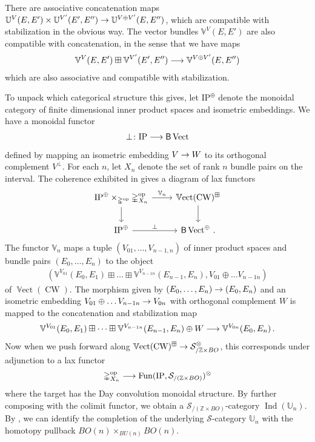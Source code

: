 \documentclass[10pt]{amsart}
\numberwithin{equation}{section}
\theoremstyle{definition}
\DeclareMathOperator{\Fun}{Fun}
\DeclareMathOperator{\op}{op}
\DeclareMathOperator{\Ind}{Ind}
\DeclareMathOperator{\Vect}{Vect}
\DeclareMathOperator{\bVect}{\mathbb{V}ect}
\DeclareMathOperator{\CW}{CW}
\newcommand{\bZ}{\mathbb{Z}}
\newcommand{\bU}{\mathbb{U}}
\newcommand{\bV}{\mathbb{V}}
\newcommand{\Simp}{\mathbb{\Delta}}
\newcommand{\cS}{\mathcal{S}}
\newcommand{\IP}{\mathrm{IP}}
\newcommand{\sfB}{\mathsf{B}}
\renewcommand{\to}{\mathchoice{\longrightarrow}{\rightarrow}{}{}}
\begin{document}
	There are associative concatenation maps $\bU^{V}(E,E')\times \bU^{V'}(E',E'') \to \bU^{V\oplus V'}(E,E'')$, which are compatible with stabilization in the obvious way.
  The vector bundles $\bV^{V}(E,E')$ are also compatible with concatenation, in the sense that we have maps
	\begin{align*}
		\bV^{V}(E,E')\boxplus \bV^{V'}(E',E'') \to \bV^{V\oplus V'}(E,E'')
	\end{align*}
	which are also associative and compatible with stabilization.

	To unpack which categorical structure this gives, let $\IP^{\oplus}$ denote the monoidal category of finite dimensional inner product spaces and isometric embeddings.
  We have a monoidal functor
	\begin{align*}
		\perp \colon \IP \to \sfB \Vect
	\end{align*}
	defined by mapping an isometric embedding $V\to W$ to its orthogonal complement $V^{\perp}$.
  For each $n$, let $X_{n}$ denote the set of rank $n$ bundle pairs on the interval.
  The coherence exhibited in  \cite[Lemma 3.18]{porcelli2024spectral} gives a diagram of lax functors
	\begin{equation*}
		\begin{tikzcd}
			\IP^{\oplus}\times_{\Simp^{\op}} \Simp^{\op}_{X_{n}} \arrow[r, "\bV_{n}"] \arrow[d]      &   \bVect(\CW)^{\boxplus}  \arrow[d] \\
			\IP^{\oplus}  \arrow[r,"\perp"]               &  \sfB \Vect^{\oplus} \,.
		\end{tikzcd}
	\end{equation*}
	The functor $\bV_{n}$ maps a tuple $(V_{01},\dots ,V_{n-1, n})$ of inner product spaces and bundle pairs $(E_{0},\dots, E_{n})$ to the object
	\begin{align*}
		(\bV^{V_{01}}(E_{0},E_{1})\boxplus \dots \boxplus \bV^{V_{n-1n}}(E_{n-1},E_{n}), V_{01}\oplus \dots V_{n-1n})
	\end{align*}
	of $\bVect(\CW)$.
  The morphism given by $(E_{0},\dots ,E_{n}) \to (E_{0},E_{n})$ and an isometric embedding $V_{01}\oplus \dots V_{n-1n} \to V_{0n}$ with orthogonal complement $W$ is mapped to the concatenation and stabilization map
	\begin{align*}
		\bV^{V_{01}}(E_{0},E_{1})\boxplus \dots \boxplus \bV^{V_{n-1n}}(E_{n-1},E_{n}) \oplus W \to \bV^{V_{0n}}(E_{0},E_{n})\,.
	\end{align*}
	Now when we push forward along $\bVect(\CW)^{\boxplus} \to \cS_{/ \bZ\times BO}^{\otimes}$, this corresponds under adjunction to a lax functor
	\begin{align*}
		\Simp^{\op}_{X_{n}} \to \Fun(\IP,\cS_{/ (\bZ\times BO)})^{\otimes}
	\end{align*}
	where the target has the Day convolution monoidal structure.
  By further composing with the colimit functor, we obtain a $\cS_{/ (\bZ\times BO)}$-category $\Ind(\bU_{n})$.
  By \cite[Lemma 3.25]{porcelli2024spectral}, we can identify the completion of the underlying $\cS$-category $\bU_{n}$ with the homotopy pullback $BO(n)\times_{BU(n)} BO(n)$.
\end{document}
